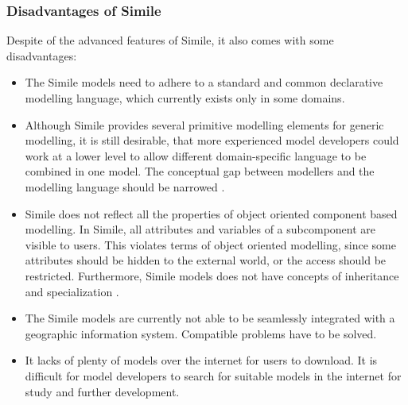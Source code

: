 \subsubsection{Disadvantages of Simile}
\par
Despite of the advanced features of Simile, it also comes with some disadvantages:
\begin{itemize}
\item 
The Simile models need to adhere to a standard and common declarative modelling language, which currently exists only in some domains.
\item
Although Simile provides several primitive modelling elements for generic modelling, it is still desirable, that more experienced model developers could work at a lower level to allow different domain-specific language to be combined in one model. The conceptual gap between modellers and the modelling language should be narrowed \autocite{dsl:simile-muetzelfeldt}.
\item
Simile does not reflect all the properties of object oriented component based modelling.  In Simile, all attributes and variables of a subcomponent are visible to users. This violates terms of object oriented modelling, since some attributes should be hidden to the external world, or the access should be restricted. Furthermore, Simile models does not have concepts of inheritance and specialization \autocite{dsl:simile-muetzelfeldt}.
\item
The Simile models are currently not able to be seamlessly integrated with a geographic information system.  Compatible problems have to be solved.
\item 
It lacks of plenty of models over the internet for users to download. It is difficult for model developers to search for suitable models in the internet for study and further development.
\end{itemize}






















